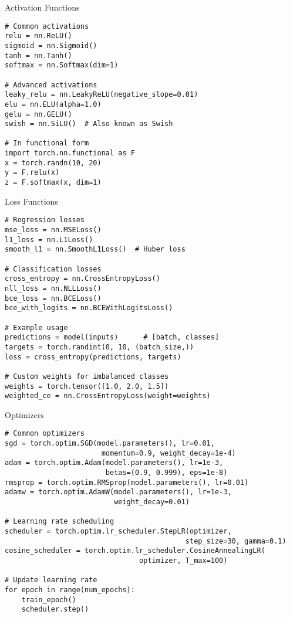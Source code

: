 \documentclass[aspectratio=169,10pt]{beamer}
\begin{document}
\begin{frame}[fragile]{Activation Functions}
\begin{lstlisting}
# Common activations
relu = nn.ReLU()
sigmoid = nn.Sigmoid()
tanh = nn.Tanh()
softmax = nn.Softmax(dim=1)

# Advanced activations
leaky_relu = nn.LeakyReLU(negative_slope=0.01)
elu = nn.ELU(alpha=1.0)
gelu = nn.GELU()
swish = nn.SiLU()  # Also known as Swish

# In functional form
import torch.nn.functional as F
x = torch.randn(10, 20)
y = F.relu(x)
z = F.softmax(x, dim=1)
\end{lstlisting}
\end{frame}

\begin{frame}[fragile]{Loss Functions}
\begin{lstlisting}
# Regression losses
mse_loss = nn.MSELoss()
l1_loss = nn.L1Loss()
smooth_l1 = nn.SmoothL1Loss()  # Huber loss

# Classification losses
cross_entropy = nn.CrossEntropyLoss()
nll_loss = nn.NLLLoss()
bce_loss = nn.BCELoss()
bce_with_logits = nn.BCEWithLogitsLoss()

# Example usage
predictions = model(inputs)      # [batch, classes]
targets = torch.randint(0, 10, (batch_size,))
loss = cross_entropy(predictions, targets)

# Custom weights for imbalanced classes
weights = torch.tensor([1.0, 2.0, 1.5])
weighted_ce = nn.CrossEntropyLoss(weight=weights)
\end{lstlisting}
\end{frame}

\begin{frame}[fragile]{Optimizers}
\begin{lstlisting}
# Common optimizers
sgd = torch.optim.SGD(model.parameters(), lr=0.01, 
                       momentum=0.9, weight_decay=1e-4)
adam = torch.optim.Adam(model.parameters(), lr=1e-3,
                        betas=(0.9, 0.999), eps=1e-8)
rmsprop = torch.optim.RMSprop(model.parameters(), lr=0.01)
adamw = torch.optim.AdamW(model.parameters(), lr=1e-3,
                          weight_decay=0.01)

# Learning rate scheduling
scheduler = torch.optim.lr_scheduler.StepLR(optimizer, 
                                           step_size=30, gamma=0.1)
cosine_scheduler = torch.optim.lr_scheduler.CosineAnnealingLR(
                                optimizer, T_max=100)

# Update learning rate
for epoch in range(num_epochs):
    train_epoch()
    scheduler.step()
\end{lstlisting}
\end{frame}
\end{document}

